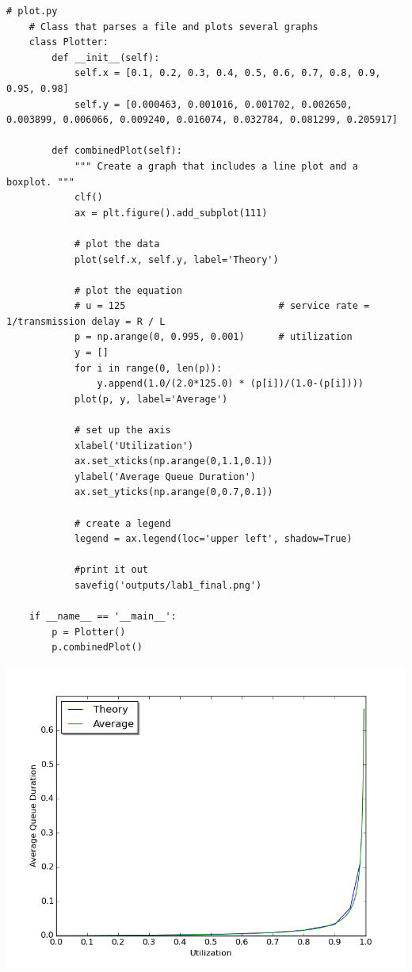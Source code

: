 \documentclass[11pt]{article}
\begin{document}
\begin{absolutelynopagebreak}
\begin{lstlisting}
# plot.py
    # Class that parses a file and plots several graphs
    class Plotter:
        def __init__(self):
            self.x = [0.1, 0.2, 0.3, 0.4, 0.5, 0.6, 0.7, 0.8, 0.9, 0.95, 0.98]
            self.y = [0.000463, 0.001016, 0.001702, 0.002650, 0.003899, 0.006066, 0.009240, 0.016074, 0.032784, 0.081299, 0.205917]

        def combinedPlot(self):
            """ Create a graph that includes a line plot and a boxplot. """
            clf()
            ax = plt.figure().add_subplot(111)

            # plot the data
            plot(self.x, self.y, label='Theory')

            # plot the equation
            # u = 125                           # service rate = 1/transmission delay = R / L
            p = np.arange(0, 0.995, 0.001)      # utilization
            y = []
            for i in range(0, len(p)):
                y.append(1.0/(2.0*125.0) * (p[i])/(1.0-(p[i])))
            plot(p, y, label='Average')

            # set up the axis
            xlabel('Utilization')
            ax.set_xticks(np.arange(0,1.1,0.1))
            ylabel('Average Queue Duration')
            ax.set_yticks(np.arange(0,0.7,0.1))

            # create a legend
            legend = ax.legend(loc='upper left', shadow=True)

            #print it out
            savefig('outputs/lab1_final.png')

    if __name__ == '__main__':
        p = Plotter()
        p.combinedPlot()
\end{lstlisting}
\end{absolutelynopagebreak}
\vspace{5mm}

\includegraphics[width=17cm]{outputs/lab1_final.png}
\end{document}
